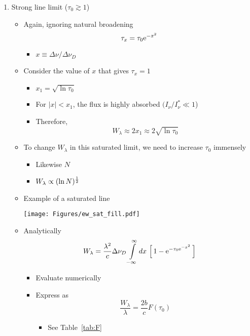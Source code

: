 \documentclass[12pt,letterpaper]{article}
\begin{document}
\begin{Aenumerate}
\begin{itemize}
\begin{enumerate}
  \item Strong line limit ($\tau_0 \gtrsim 1$)
	\begin{itemize}
	\item Again, ignoring natural broadening
	\begin{equation}
	\tau_x = \tau_0 {\rm e}^{-x^2}
	\end{equation}
		\begin{itemize}
		\item $x \equiv \Delta \nu / \Delta \nu_D$
		\end{itemize}
	\item Consider the value of $x$ that gives $\tau_x = 1$
		\begin{itemize}
		\item $x_1 = \sqrt{\ln \tau_0}$
		\item For $|x| < x_1$, the flux is highly absorbed $(I_\nu/I_\nu^* \ll 1$)
		\item Therefore, 
		\begin{equation}
		W_\lambda \approx 2 x_1 \approx 2 \sqrt{\ln \tau_0}
		\end{equation}
		\end{itemize}
	\item To change $W_\lambda$ in this saturated
	limit, we need to increase $\tau_0$ immensely
		\begin{itemize}
		\item Likewise $N$
		\item $W_\lambda \propto (\ln N)^{\frac{1}{2}}$
		\end{itemize}

	\item Example of a saturated line

	\texttt{[image: Figures/ew\_sat\_fill.pdf]}

	\item Analytically
	\begin{equation}
	W_\lambda = \frac{\lambda^2}{c} \Delta\nu_D \int\limits_{-\infty}^\infty
		dx \, \left [ \, 1 - {\rm e}^{-\tau_0 {\rm e}^{-x^2} } \, \right ]
	\end{equation}
		\begin{itemize}
		\item Evaluate numerically
		\item Express as 
		\begin{equation}
		\frac{W_\lambda}{\lambda} = \frac{2 b}{c} F(\tau_0)
		\end{equation}
			\begin{itemize}
			\item See Table~\ref{tab:F}
			\end{itemize}


\end{itemize}
\end{itemize}
\end{enumerate}
\end{itemize}
\end{Aenumerate}
\end{document}
